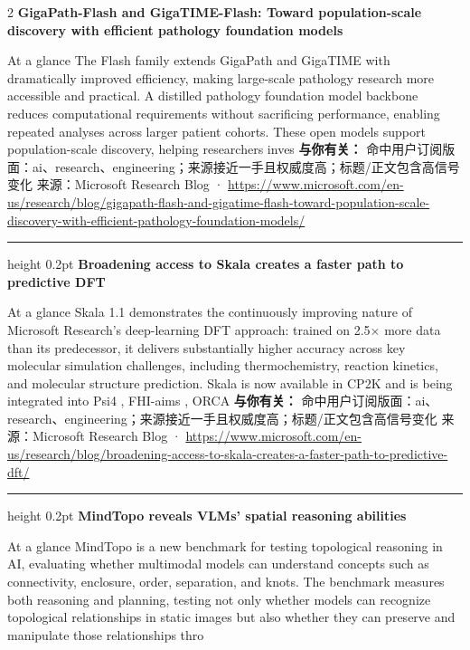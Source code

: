 \documentclass[10.5pt]{ctexart}
\begin{document}
\begin{multicols}{2}
{\large\bfseries GigaPath-Flash and GigaTIME-Flash: Toward population-scale discovery with efficient pathology foundation models}\par
At a glance The Flash family extends GigaPath and GigaTIME with dramatically improved efficiency, making large-scale pathology research more accessible and practical. A distilled pathology foundation model backbone reduces computational requirements without sacrificing performance, enabling repeated analyses across larger patient cohorts. These open models support population-scale discovery, helping researchers inves
\textbf{与你有关：} 命中用户订阅版面：ai、research、engineering；来源接近一手且权威度高；标题/正文包含高信号变化
{\footnotesize\color{ormuted} 来源：Microsoft Research Blog · \url{https://www.microsoft.com/en-us/research/blog/gigapath-flash-and-gigatime-flash-toward-population-scale-discovery-with-efficient-pathology-foundation-models/}}
\vspace{2mm}
\hrule height 0.2pt
\vspace{2mm}
{\large\bfseries Broadening access to Skala creates a faster path to predictive DFT}\par
At a glance Skala 1.1 demonstrates the continuously improving nature of Microsoft Research’s deep-learning DFT approach: trained on 2.5× more data than its predecessor, it delivers substantially higher accuracy across key molecular simulation challenges, including thermochemistry, reaction kinetics, and molecular structure prediction. Skala is now available in CP2K and is being integrated into Psi4 , FHI-aims , ORCA 
\textbf{与你有关：} 命中用户订阅版面：ai、research、engineering；来源接近一手且权威度高；标题/正文包含高信号变化
{\footnotesize\color{ormuted} 来源：Microsoft Research Blog · \url{https://www.microsoft.com/en-us/research/blog/broadening-access-to-skala-creates-a-faster-path-to-predictive-dft/}}
\vspace{2mm}
\hrule height 0.2pt
\vspace{2mm}
{\large\bfseries MindTopo reveals VLMs’ spatial reasoning abilities}\par
At a glance MindTopo is a new benchmark for testing topological reasoning in AI, evaluating whether multimodal models can understand concepts such as connectivity, enclosure, order, separation, and knots. The benchmark measures both reasoning and planning, testing not only whether models can recognize topological relationships in static images but also whether they can preserve and manipulate those relationships thro

\end{multicols}
\end{document}
